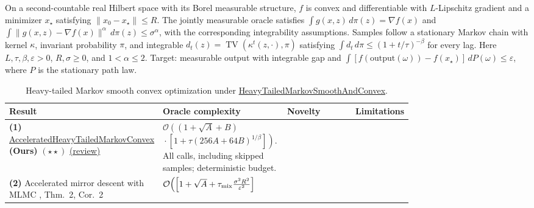 \begin{table}[tp]
\centering
\caption{Heavy-tailed Markov smooth convex optimization under \href{https://github.com/k3nfalt/longtails/blob/main/LongTails/Setups/HeavyTailedMarkovSmoothAndConvex.lean}{HeavyTailedMarkovSmoothAndConvex}.}\label{tab:HeavyTailedMarkovSmoothAndConvex}
\parbox{\linewidth}{\footnotesize
On a second-countable real Hilbert space with its Borel measurable structure, $f$ is convex and differentiable with $L$-Lipschitz gradient and a minimizer $x_\star$ satisfying $\|x_0-x_\star\|\le R$. The jointly measurable oracle satisfies $\int g(x,z)\,d\pi(z)=\nabla f(x)$ and $\int\|g(x,z)-\nabla f(x)\|^\alpha\,d\pi(z)\le\sigma^\alpha$, with the corresponding integrability assumptions. Samples follow a stationary Markov chain with kernel $\kappa$, invariant probability $\pi$, and integrable $d_t(z)=\operatorname{TV}(\kappa^t(z,\cdot),\pi)$ satisfying $\int d_t\,d\pi\le(1+t/\tau)^{-\beta}$ for every lag. Here $L,\tau,\beta,\varepsilon>0$, $R,\sigma\ge0$, and $1<\alpha\le2$. Target: measurable output with integrable gap and $\int[f(\mathrm{output}(\omega))-f(x_\star)]\,dP(\omega)\le\varepsilon$, where $P$ is the stationary path law.}\par\smallskip
\begin{threeparttable}
\footnotesize
\setlength{\tabcolsep}{4pt}\renewcommand{\arraystretch}{1.25}
\begin{tabularx}{\linewidth}{@{}>{\raggedright\arraybackslash}p{0.20\linewidth}>{\raggedright\arraybackslash}p{0.32\linewidth}>{\raggedright\arraybackslash}p{0.25\linewidth}>{\raggedright\arraybackslash}X@{}}
\toprule
\textbf{Result} & \textbf{Oracle complexity} & \textbf{Novelty} & \textbf{Limitations} \\
\midrule
\textbf{(1)} \href{https://github.com/k3nfalt/longtails/blob/main/LongTails/Theorems/AcceleratedHeavyTailedMarkovConvex.lean}{Accelerated\allowbreak Heavy\allowbreak Tailed\allowbreak Markov\allowbreak Convex} \textbf{(Ours)} $(\star\star)$ \href{https://github.com/k3nfalt/longtails/blob/main/scripts/reviews/AcceleratedHeavyTailedMarkovConvex.md}{(review)}
& $\mathcal{O}\!\left((1+\sqrt A+B)\right.$\newline
$\left.{}\cdot[1+\tau(256A+64B)^{1/\beta}]\right)$.
All calls, including skipped samples; deterministic budget.
& & \\
\midrule[1.2pt]
\textbf{(2)} Accelerated mirror descent with MLMC \citep{htmSolodkin2025v2}, Thm.~2, Cor.~2
& $\mathcal{O}\!\left(\left[1+\sqrt A+\tau_{\rm mix}\frac{\sigma^2R^2}{\varepsilon^2}\right]\right.$\newline

\end{tabularx}
\end{threeparttable}
\end{table}
